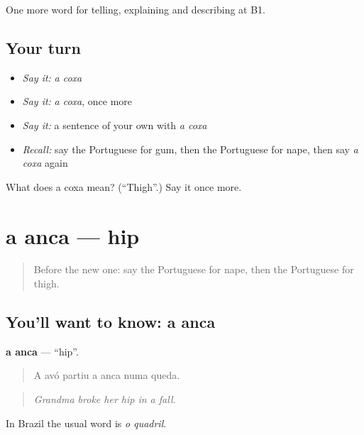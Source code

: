 \begin{grammarlens}[title={What you've built}]
One more word for telling, explaining and describing at B1.
\end{grammarlens}

\subsection*{Your turn}
\begin{itemize}
\raggedright
  \item \emph{Say it:} \emph{a coxa}
  \item \emph{Say it:} \emph{a coxa}, once more
  \item \emph{Say it:} a sentence of your own with \emph{a coxa}
  \item \emph{Recall:} say the Portuguese for gum, then the Portuguese for nape, then say \emph{a coxa} again
\end{itemize}

\begin{tcolorbox}[breakable,colback=teal!4,colframe=teal!35!black,title={Before you move on}]
What does a coxa mean? (\textquotedblleft{}Thigh\textquotedblright{}.) Say it once more.
\end{tcolorbox}
\section[a anca]{a anca — hip}

\label{lesson:PT-C482-anca}



\begin{quote}
Before the new one: say the Portuguese for nape, then the Portuguese for thigh.
\end{quote}

\subsection*{You'll want to know: a anca}
\textbf{a anca} — \textquotedblleft{}hip\textquotedblright{}.

\begin{quote}
A avó partiu a anca numa queda.
\end{quote}

\begin{quote}
\emph{Grandma broke her hip in a fall.}
\end{quote}

In Brazil the usual word is \emph{o quadril}.

